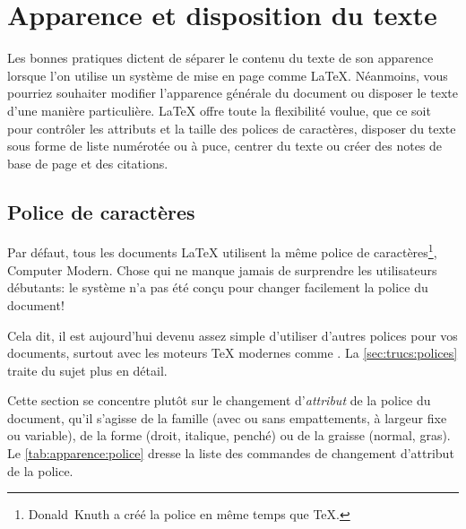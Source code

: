 
\chapter{Apparence et disposition du texte}
\label{chap:apparence}

Les bonnes pratiques dictent de séparer le contenu du texte de son
apparence lorsque l'on utilise un système de mise en page comme
{\LaTeX}. Néanmoins, vous pourriez souhaiter modifier l'apparence
générale du document ou disposer le texte d'une manière particulière.
{\LaTeX} offre toute la flexibilité voulue, que ce soit pour contrôler
les attributs et la taille des polices de caractères, disposer du
texte sous forme de liste numérotée ou à puce, centrer du texte ou
créer des notes de base de page et des citations.

\section{Police de caractères}
\label{sec:apparence:police}

Par défaut, tous les documents {\LaTeX} utilisent la même police de
caractères\footnote{%
  Donald~Knuth a créé la police en même temps que {\TeX}.}, %
{\selectfont Computer Modern}. Chose qui ne manque
jamais de surprendre les utilisateurs débutants: le système n'a pas
été conçu pour changer facilement la police du document!

Cela dit, il est aujourd'hui devenu assez simple d'utiliser d'autres
polices pour vos documents, surtout avec les moteurs {\TeX} modernes
comme {\XeTeX}. La \autoref{sec:trucs:polices} traite du sujet plus en
détail.

Cette section se concentre plutôt sur le changement d'\emph{attribut}
de la police du document, qu'il s'agisse de la famille (avec ou sans
empattements, à largeur fixe ou variable), de la forme (droit,
italique, penché) ou de la graisse (normal, gras). Le
\autoref{tab:apparence:police} dresse la liste des commandes de
changement d'attribut de la police.

